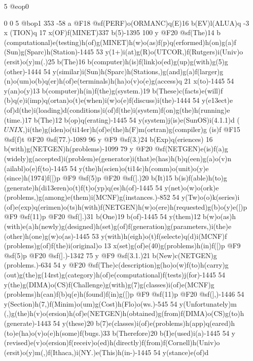 {{{{{{{{{{{{{{5 @eop0

0 0 5 @bop1 353 -58 a @F18 @sf(PERF)o(ORMANC)q(E)16 b(EV)l(ALUA)q -3 x
(TION)q 17 x(OF)f(MINET)337 b(5)-1395 100 y @F20 @sf(The)14 b
(computational)e(testing)h(of)g(MINET)h(w)o(as)f(p)q(erformed)h(on)g(a)f
(Sun)g(Sparc)h(Station)-1445 53 y(1+)i(at)g(R)o(UTCOR,)f(Rutgers)i(Univ)o
(ersit)o(y)m(.)25 b(The)16 b(computer)h(is)f(link)o(ed)g(up)g(with)g(5)g
(other)-1444 54 y(similar)i(Sun)h(Sparc)h(Stations,)g(and)g(a)f(larger)g
(n)o(um)o(b)q(er)h(of)e(terminals)h(ha)o(v)o(e)g(access)q 21 x(to)-1445 
54 y(an)o(y)13 b(computer)h(in)f(the)g(system.)19 b(These)c(facts)e(will)f
(b)q(e)i(imp)q(ortan)o(t)e(when)i(w)o(e)f(discuss)i(the)-1444 54 y(e\013ect)e
(of)d(the)i(loading)d(conditions)i(of)f(the)i(system)f(on)g(the)h(running)e
(time.)17 b(The)12 b(op)q(erating)-1445 54 y(system)j(is)e(SunOS)i(4.1.1)d
(\(UNIX\),)i(the)g(iden)o(ti\014er)h(of)e(the)h(F)m(ortran)g(compiler)g
(is)f @F15 @sf(f)t @F20 @sf(77.)-1089 96 y @F9 @sf(3.)24 b(Exp)q(eriences)
16 b(with)g(NETGEN)h(problems)-1099 79 y @F20 @sf(NETGEN)e(is)f(a)g
(widely)g(accepted)i(problem)e(generator)i(that)e(has)h(b)q(een)g(a)o(v)n
(ailabl)o(e)f(to)-1445 54 y(the)h(scien)o(ti\014c)h(comm)o(unit)o(y)e
(since)h(1974)f([)p @F9 @sf(5)p @F20 @sf(].)20 b(It)15 b(is)f(able)h(to)g
(generate)h(di\013eren)o(t)f(t)o(yp)q(es)h(of)-1445 54 y(net)o(w)o(ork)e
(problems,)g(among)e(them)i(MCNF)g(instances.)-852 54 y(Tw)o(o)k(series)i
(of)e(exp)q(erimen)o(ts)h(with)f(NETGEN)h(w)o(ere)h(requested)g(b)o(y)e([)p 
@F9 @sf(11)p @F20 @sf(].)31 b(One)19 b(of)-1445 54 y(them)12 b(w)o(as)h
(with)e(a)h(newly)g(designed)h(set)g(of)f(generation)g(parameters,)i(the)e
(other)h(one)g(w)o(as)-1445 53 y(with)h(eigh)o(t)f(selecte)q(d)i(MCNF)f
(problems)g(of)f(the)i(original)o 13 x(set)g(of)e(40)g(problems)h(in)f([)p 
@F9 @sf(5)p @F20 @sf(].)-1342 75 y @F9 @sf(3.1.)21 b(New)c(NETGEN)g
(problems.)-634 54 y @F20 @sf(The)c(description)g(ho)o(w)f(to)h(carry)g
(out)g(the)g(\014rst)g(category)h(of)e(computational)f(tests)j(for)-1445 
54 y(the)g(DIMA)o(CS)f(Challenge)g(with)g(7)g(classes)i(of)e(MCNF)g
(problems)h(can)f(b)q(e)h(found)f(in)g([)p @F9 @sf(11)p @F20 @sf(],)-1446 
54 y(Section)h(7,)f(Minim)o(um)g(Cost)h(Flo)o(ws.)-545 54 y(Unfortunately)m
(,)g(the)h(v)o(ersion)h(of)e(NETGEN)h(obtained)g(from)f(DIMA)o(CS)g(to)h
(generate)-1443 54 y(these)20 b(7)e(classes)i(of)e(problems)h(app)q(eared)h
(to)e(ha)o(v)o(e)h(some)f(bugs.)33 b(Therefore)20 b(I)e(used)i(a)-1445 54 y
(revised)e(v)o(ersion)f(receiv)o(ed)h(directly)f(from)f(Cornell)h(Univ)o
(ersit)o(y)m(,)f(Ithaca,)i(NY.)e(This)h(in-)-1445 54 y(stance)e(of)d
}}}}}}}}}}}}}}
